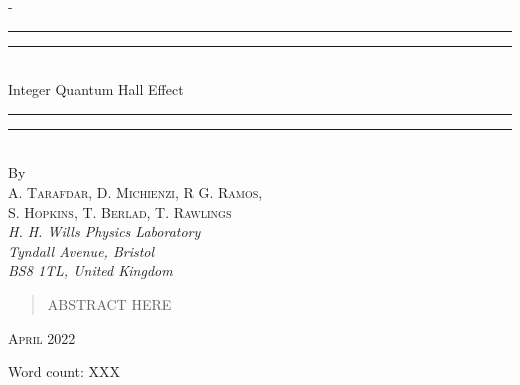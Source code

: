 \begin{titlingpage}
\begin{SingleSpace}
\calccentering{\unitlength} 
\begin{adjustwidth*}{\unitlength}{-\unitlength}
\vspace*{-1cm}
\begin{center}
\rule[0.5ex]{\linewidth}{2pt}\vspace*{-\baselineskip}\vspace*{3.2pt}
\rule[0.5ex]{\linewidth}{1pt}\\[\baselineskip]
{\HUGE Integer Quantum Hall Effect }\\[4mm]

\rule[0.5ex]{\linewidth}{1pt}\vspace*{-\baselineskip}\vspace{3.2pt}
\rule[0.5ex]{\linewidth}{2pt}\\
\vspace{6.5mm}
{\large By}\\
\vspace{6.5mm}
{\large\textsc{A. Tarafdar, D. Michienzi, R G. Ramos, \\ \vspace{0.1cm}S. Hopkins, T. Berlad, T. Rawlings}}\\
\vspace{11mm}
\vspace{6mm}
\textit{H. H. Wills Physics Laboratory \\ Tyndall Avenue, Bristol \\ BS8 1TL, United Kingdom}\\
\vspace{11mm}
\begin{abstract}
ABSTRACT HERE
\end{abstract}
\vspace{9mm}
{\large\textsc{April 2022}}
\vspace{12mm}
\end{center}
\begin{flushright}
{\small Word count: XXX}
\end{flushright}
\end{adjustwidth*}
\end{SingleSpace}
\end{titlingpage}
